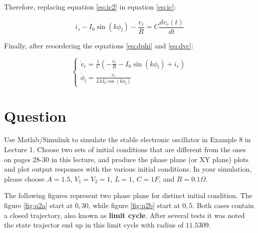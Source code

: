 \documentclass[a4paper,10pt]{article}
\begin{document}
Therefore, replacing equation \ref{eq:ic2} in equation \ref{eq:ic}: 

\begin{equation}
i_s - I_0\sin(k\phi_l) - \frac{v_c}{R} = C\frac{dv_c(t)}{dt} \label{eq:dvc}
\end{equation}

Finally, after reoordering the equations \ref{eq:dphi} and \ref{eq:dvc}:

\begin{equation}
  \begin{cases}
    \dot{v}_c = \frac{1}{C} \left(- \frac{v_c}{R} - I_0\sin(k\phi_l)+ i_s\right)\\
    \dot{\phi}_l = \frac{v_c}{LkI_0\cos(k\phi_l)}
  \end{cases}
\end{equation}
\section{Question}
Use Matlab/Simulink to simulate the stable electronic oscillator in Example 8 in Lecture 1. Choose two sets of initial conditions that are different from the ones on pages 28-30 in this lecture, and produce the phase plane (or XY plane) plots and
plot output responses with the various initial conditions. 
In your simulation, please choose $A=1.5$, $V_1 =V_2 =1$, $L=1$, $C=1F$, and $R=0.1\Omega$.

\hfill \break

The following figures represent two phase plane for distinct initial condition. The figure \ref{fig:q2a} start at $0,30$, while figure \ref{fig:q2b} start at $0,5$. Both cases contain a closed trajectory, also known as \textbf{limit cycle}. After several tests it was noted the state trajector end up in this limit cycle with radius of $11.5309$.
\end{document}
